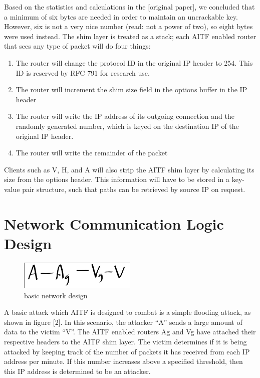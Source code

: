 \documentclass[11pt]{article}
\begin{document}
Based on the statistics and calculations in the [original paper], we concluded
that a minimum of six bytes are needed in order to maintain an uncrackable key.
However, six is not a very nice number (read: not a power of two), so eight
bytes were used instead. The shim layer is treated as a stack; each AITF enabled
router that sees any type of packet will do four things: \\
\begin{enumerate}
	\item The router will change the protocol ID in the original IP header to
     254. This ID is reserved by RFC 791 for research use.
	\item The router will increment the shim size field in the options buffer
     in the IP header
	\item The router will write the IP address of its outgoing connection and
     the randomly generated number, which is keyed on the destination IP
     of the original IP header.
	\item The router will write the remainder of the packet
\end{enumerate}
Clients such as V, H, and A will also strip the AITF shim layer by calculating
its size from the options header. This information will have to be stored in a
key-value pair structure, such that paths can be retrieved by source IP on
request.


\section{Network Communication Logic Design}
\begin{figure}[h!]
 \caption{basic network design}
 \centering
  \includegraphics[width=0.5\textwidth]{basic}
\end{figure}
A basic attack which AITF is designed to combat is a simple flooding attack, as
shown in figure [2]. In this scenario, the attacker “A” sends a large amount of
data to the victim “V”. The AITF enabled routers Ag and Vg have attached their
respective headers to the AITF shim layer. The victim determines if it is being
attacked by keeping track of the number of packets it has received from each IP
address per minute. If this number increases above a specified threshold, then
this IP address is determined to be an attacker. 
\end{document}

